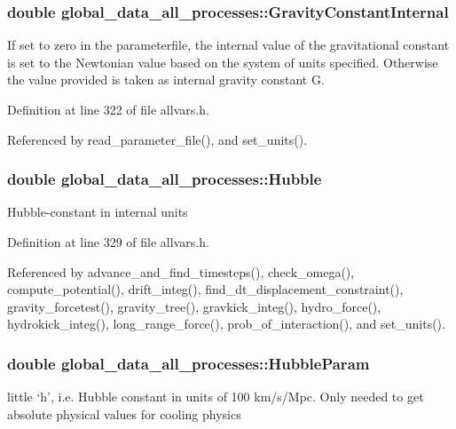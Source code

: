 \hypertarget{structglobal__data__all__processes_a3ebe48dc90c65aa0ed7ddfe8431987b1}{
\subsubsection[{GravityConstantInternal}]{\setlength{\rightskip}{0pt plus 5cm}double {\bf global\_\-data\_\-all\_\-processes::GravityConstantInternal}}}
\label{structglobal__data__all__processes_a3ebe48dc90c65aa0ed7ddfe8431987b1}
If set to zero in the parameterfile, the internal value of the gravitational constant is set to the Newtonian value based on the system of units specified. Otherwise the value provided is taken as internal gravity constant G. 

Definition at line 322 of file allvars.h.



Referenced by read\_\-parameter\_\-file(), and set\_\-units().

\hypertarget{structglobal__data__all__processes_a6e6a37250907d90a56f92a55aefdda5f}{
\subsubsection[{Hubble}]{\setlength{\rightskip}{0pt plus 5cm}double {\bf global\_\-data\_\-all\_\-processes::Hubble}}}
\label{structglobal__data__all__processes_a6e6a37250907d90a56f92a55aefdda5f}
Hubble-\/constant in internal units 

Definition at line 329 of file allvars.h.



Referenced by advance\_\-and\_\-find\_\-timesteps(), check\_\-omega(), compute\_\-potential(), drift\_\-integ(), find\_\-dt\_\-displacement\_\-constraint(), gravity\_\-forcetest(), gravity\_\-tree(), gravkick\_\-integ(), hydro\_\-force(), hydrokick\_\-integ(), long\_\-range\_\-force(), prob\_\-of\_\-interaction(), and set\_\-units().

\hypertarget{structglobal__data__all__processes_a51f2bde6feb49841d60397964a9740ac}{
\subsubsection[{HubbleParam}]{\setlength{\rightskip}{0pt plus 5cm}double {\bf global\_\-data\_\-all\_\-processes::HubbleParam}}}
\label{structglobal__data__all__processes_a51f2bde6feb49841d60397964a9740ac}
little `h', i.e. Hubble constant in units of 100 km/s/Mpc. Only needed to get absolute physical values for cooling physics 

